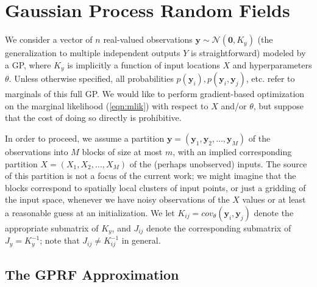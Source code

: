 \documentclass{article}
\newcommand{\N}{\mathcal{N}}
\renewcommand{\v}[1]{\mathbf{#1}}
\begin{document}
\section{Gaussian Process Random Fields}
\label{sec:gprf}

We consider a vector of $n$ real-valued observations $\v{y} \sim \N(\v{0}, K_y)$ (the generalization to
multiple independent outputs $Y$ is straightforward) modeled by a GP,
where $K_y$ is implicitly a function of input locations $X$ and hyperparameters $\theta$. Unless otherwise specified, all probabilities $p(\v{y}_i),
p(\v{y}_i, \v{y}_j)$, etc. refer to marginals of this full GP. We
would like to perform gradient-based optimization on the marginal
likelihood (\ref{eqn:mlik}) with respect to $X$ and/or $\theta$, but suppose that the cost of doing so directly is prohibitive.

In order to proceed, we assume a partition $\v{y} = (\v{y}_1, \v{y}_2, \ldots,
\v{y}_M)$ of the observations into $M$ blocks of size at most $m$, with an
implied corresponding partition $X = (X_1, X_2, \ldots, X_M)$ of the
(perhaps unobserved) inputs. The source of this partition is not a focus of the current
work; we might imagine that the blocks correspond to 
spatially local clusters of input points, or just a gridding of the
input space, whenever we have noisy observations of the $X$ values or
at least a reasonable guess at an initialization. We let $K_{ij} =
cov_\theta(\v{y}_i, \v{y}_j)$ denote the appropriate submatrix of
$K_{y}$, and $J_{ij}$ denote the corresponding submatrix of
$J_y=K_y^{-1}$; note that $J_{ij} \ne K_{ij}^{-1}$ in general. 

\subsection{The GPRF Approximation}
\end{document}
